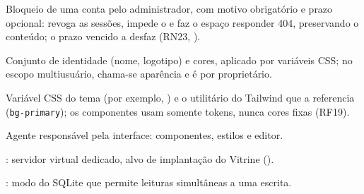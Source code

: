 \begin{description}[style=nextline, leftmargin=0.6cm, itemsep=4pt]
  \item[Suspensão] Bloqueio de uma conta pelo administrador, com motivo obrigatório e prazo opcional: revoga as sessões, impede o  e faz o espaço responder 404, preservando o conteúdo; o prazo vencido a desfaz (RN23, ).
  \item[Tema] Conjunto de identidade (nome, logotipo) e cores, aplicado por variáveis CSS; no escopo multiusuário, chama-se aparência e é por proprietário.
  \item[Token de tema] Variável CSS do tema (por exemplo, ) e o utilitário do Tailwind que a referencia (\texttt{bg-primary}); os componentes usam somente tokens, nunca cores fixas (RF19).
  \item[UI] Agente responsável pela interface: componentes, estilos e editor.
  \item[VPS] : servidor virtual dedicado, alvo de implantação do Vitrine ().
  \item[WAL] : modo do SQLite que permite leituras simultâneas a uma escrita.
\end{description}
